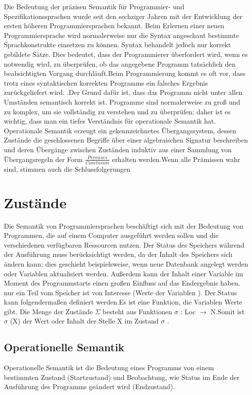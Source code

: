 \documentclass[a4paper,12pt,twoside,headsepline]{scrartcl}
\begin{document}
Die Bedeutung der präzisen Semantik für Programmier- und Spezifikationssprachen wurde seit den sechziger Jahren mit der Entwicklung der ersten höheren Programmiersprachen bekannt. 
Beim Erlernen einer neuen Programmiersprache wird normalerweise nur die Syntax angeschaut bestimmte Sprachkonstrukte einsetzen zu können. Syntax behandelt jedoch nur korrekt gebildete Sätze. 
Dies bedeutet, dass der Programmierer überfordert wird, wenn es notwendig wird, zu überprüfen, ob das angegebene Programm tatsächlich den beabsichtigten Vorgang durchläuft.Beim Programmierung kommt es oft vor, dass trotz eines syntaktischen korrekten Programms ein falsches Ergebnis zurückgeliefert wird.  .Der Grund dafür ist, dass das Programm nicht unter allen Umständen semantisch korrekt ist. Programme sind normalerweise zu groß und zu komplex, um sie vollständig zu verstehen und zu überprüfen; daher ist es wichtig, dass man ein tiefes Verständnis für operationale Semantik hat.
 Operationale Semantik erzeugt ein gekennzeichnetes Übergangssystem, dessen Zustände die geschlossenen Begriffe über einer algebraischen Signatur beschreiben und deren Übergänge zwischen Zuständen induktiv aus einer Sammlung von Übergangsregeln der Form $\frac{ Permises} {Conclusion}$ erhalten werden.Wenn alle Prämissen wahr sind, stimmen auch die Schlussfolgerungen

\section{Zustände}
Die Semantik von Programmiersprachen beschäftigt sich mit der Bedeutung von Programmen, die auf einem Computer ausgeführt werden sollen und die verschiedenen verfügbaren Ressourcen nutzen.
 Der Status des Speichers während der Ausführung muss berücksichtigt werden, da der Inhalt des Speichers sich ändern kann; dies geschieht beispielsweise, wenn neue Datenbank angelegt werden oder Variablen aktualisiert werden.
Außerdem kann der Inhalt einer Variable im Moment des Programmstarts  einen großen Einfluss auf das Endergebnis haben.
nur ein Teil vom Speicher ist von Interesse (Werte der Variablen ).
Der Status kann folgendermaßen definiert werden.Es ist eine Funktion, die Variablen Werte  gibt.
 Die Menge der Zustände $\Sigma$ besteht aus Funktionen $\sigma$ : Loc $\rightarrow$ N.Somit ist $\sigma$ (X) der Wert oder Inhalt der Stelle X im Zustand $\sigma$ .
 
 \subsection{Operationelle Semantik}
Operationelle Semantik ist die Bedeutung eines Programms von einem bestimmten Zustand (Startzustand) und Beobachtung, wie Status im Ende der Ausführung des Programms geändert wird (Endzustand).
\end{document}
